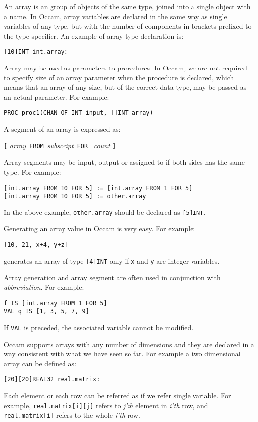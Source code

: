 
An array is an group of objects of the same type, joined into a single
object with a name.  In Occam, array variables are declared in the same
way as single variables of any type, but with the number of components
in brackets prefixed to the type specifier.  An example of array type
declaration is:
\begin{lin}
{\tt [10]INT int.array:} \\
\end{lin}

Array may be used as parameters to procedures.  In Occam, we are not
required to specify size of an array parameter when the procedure is
declared, which means that an array of any size, but of the correct
data type, may be passed as an actual parameter.  For example:
\begin{lin}
{\tt PROC proc1(CHAN OF INT input, []INT array)}
\end{lin}

A segment of an array is expressed as:
\begin{lin}
{\tt [} {\em array}\ {\tt FROM}\ {\em subscript}\ {\tt FOR}\ {\em
count} {\tt ]}
\end{lin}
Array segments may be input, output or assigned to if both sides has
the same type.  For example:
\begin{lin}
\begin{verbatim}
[int.array FROM 10 FOR 5] := [int.array FROM 1 FOR 5]
[int.array FROM 10 FOR 5] := other.array
\end{verbatim}
\end{lin}
In the above example, {\tt other.array} should be declared as
{\tt [5]INT}.

Generating an array value in Occam is very easy. For example:
\begin{lin}
{\tt [10, 21, x+4, y+z]}
\end{lin}
generates an array of type {\tt [4]INT} only if {\tt x} and {\tt y}
are integer variables. 

Array generation and array segment are often used in conjunction with
{\em abbreviation}. For example:
\begin{lin}
\begin{verbatim}
f IS [int.array FROM 1 FOR 5]
VAL q IS [1, 3, 5, 7, 9]
\end{verbatim}
\end{lin}
If {\tt VAL} is preceded, the associated variable cannot be modified. 

Occam supports arrays with any number of dimensions and they are
declared in a way consistent with what we have seen so far.  For
example a two dimensional array can be defined as:
\begin{lin}
{\tt [20][20]REAL32 real.matrix:}
\end{lin}
Each element or each row can be referred as if we refer single
variable.  For example, {\tt real.matrix[i][j]} refers to {\em j'th}
element in {\em i'th} row, and {\tt real.matrix[i]} refers to the
whole {\em i'th} row.

